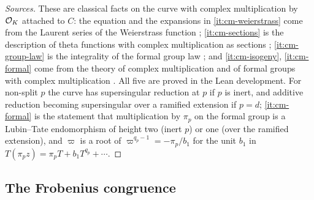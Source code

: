 
\begin{proof}[Sources]
These are classical facts on the curve with complex multiplication by $\mathcal{O}_K$ attached to $C$: the equation and the
expansions in \ref{it:cm-weierstrass} come from the Laurent series of the Weierstrass function \cite[Ch.~VI]{Silverman2009};
\ref{it:cm-sections} is the description of theta functions with complex multiplication as sections \cite{Shimura1976};
\ref{it:cm-group-law} is the integrality of the formal group law \cite[Ch.~IV]{Silverman2009}; and \ref{it:cm-isogeny},
\ref{it:cm-formal} come from the theory of complex multiplication \cite[Ch.~II]{Silverman1994} and of formal groups with
complex multiplication \cite{LubinTate1965}. All five are proved in the Lean development.
For non-split $p$ the curve has supersingular reduction at $p$ if $p$ is inert, and additive
reduction becoming supersingular over a ramified extension if $p=d$; \ref{it:cm-formal} is the
statement that multiplication by $\pi_p$ on the formal group is a Lubin--Tate endomorphism of height
two (inert $p$) or one (over the ramified extension), and $\varpi$ is a root of
$\varpi^{q_p-1}=-\pi_p/b_1$ for the unit $b_1$ in $T(\pi_pz)=\pi_pT+b_1T^{q_p}+\cdots$.
\end{proof}

\subsection{The Frobenius congruence}\label{ss:frobenius-congruence}


